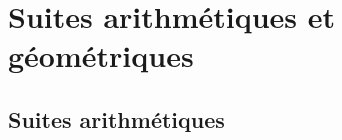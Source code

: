 \documentclass{poly}
\begin{document}
%
%
%
%
%
%
%
%
%


\chapter{Suites arithmétiques et géométriques}

\section{Suites arithmétiques}
\end{document}
